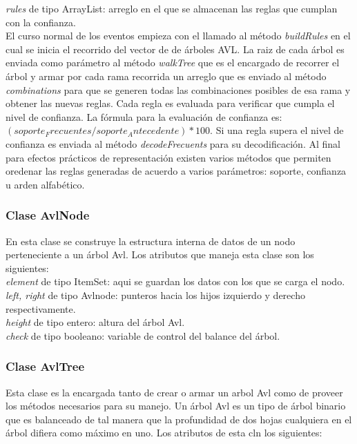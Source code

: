 \textit{rules }de tipo ArrayList: arreglo en el que se almacenan las reglas que cumplan con la confianza.\\

El curso normal de los eventos empieza con el llamado al m\'etodo \textit{buildRules }en el cual se inicia el
recorrido del vector de de \'arboles AVL. La raiz de cada \'arbol es enviada como par\'ametro al m\'etodo
\textit{walkTree }que es el encargado de recorrer el \'arbol y armar por cada rama recorrida un arreglo que es
enviado al m\'etodo \textit{combinations }para que se generen todas las combinaciones posibles de esa rama y
obtener las nuevas reglas. Cada regla es evaluada para verificar que cumpla el nivel de confianza. La f\'ormula
para la evaluaci\'on de confianza es: $(soporte_Frecuentes / soporte_Antecedente) * 100$. Si una regla supera el
nivel de confianza es enviada al m\'etodo \textit{decodeFrecuents} para su decodificaci\'on. Al final para efectos
pr\'acticos de representaci\'on existen varios m\'etodos que permiten oredenar las reglas generadas de acuerdo a
varios par\'ametros: soporte, confianza u arden alfab\'etico.

\subsubsection{Clase AvlNode}
En esta clase se construye la estructura interna de datos de un nodo perteneciente a un \'arbol Avl. Los atributos
que maneja esta clase son los siguientes:\\

 \textit{element} de tipo ItemSet: aqui se guardan los datos con los que se carga el nodo.\\

 \textit{left, right} de tipo Avlnode: punteros hacia los hijos izquierdo y derecho respectivamente.\\

 \textit{height} de tipo entero: altura del \'arbol Avl.\\

 \textit{check} de tipo booleano: variable de control del balance del \'arbol.

\subsubsection{Clase AvlTree}

Esta clase es la encargada tanto de crear o armar un arbol Avl como de proveer los m\'etodos necesarios para su
manejo. Un \'arbol Avl es un tipo de \'arbol binario que es balanceado de tal manera que la profundidad de dos
hojas cualquiera en el \'arbol difiera como m\'aximo en uno. Los atributos de esta cln los siguientes:\\

